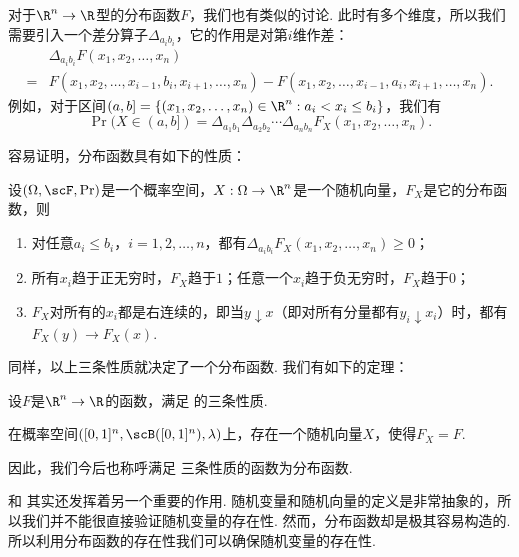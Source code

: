 对于$\R^n\to\R$型的分布函数$F$，我们也有类似的讨论. 此时有多个维度，所以我们需要引入一个差分算子$\Delta_{a_ib_i}$，它的作用是对第$i$维作差：
\begin{align*}
    &\Delta_{a_ib_i}F(x_1,x_2,\ldots,x_n) \\
    = &F(x_1,x_2,\ldots,x_{i-1},b_i,x_{i+1},\ldots,x_n)-F(x_1,x_2,\ldots,x_{i-1},a_i,x_{i+1},\ldots,x_n).
\end{align*}
例如，对于区间$(a,b]=\{(x_1,x_2,\ldots,x_n)\in\R^n:a_i<x_i\leq b_i\}$，我们有
\[
    \Pr(X\in(a,b]) = \Delta_{a_1b_1}\Delta_{a_2b_2}\cdots\Delta_{a_nb_n}F_X(x_1,x_2,\ldots,x_n).
\]

容易证明，分布函数具有如下的性质：

\begin{proposition}\label{prop:distribution-function-n}
设$(\Omega,\scF,\Pr)$是一个概率空间，$X:\Omega\to\R^n$是一个随机向量，$F_X$是它的分布函数，则
\begin{enumerate}
    \item 对任意$a_i\leq b_i$，$i=1,2,\ldots,n$，都有$\Delta_{a_ib_i}F_X(x_1,x_2,\ldots,x_n)\geq 0$；
    \item 所有$x_i$趋于正无穷时，$F_X$趋于$1$；任意一个$x_i$趋于负无穷时，$F_X$趋于$0$；
    \item $F_X$对所有的$x_i$都是右连续的，即当$y\downarrow x$（即对所有分量都有$y_i\downarrow x_i$）时，都有$F_X(y)\to F_X(x)$.
\end{enumerate}
\end{proposition}

同样，以上三条性质就决定了一个分布函数. 我们有如下的定理：

\begin{theorem}\label{thm:distribution-function-n}
设$F$是$\R^n\to\R$的函数，满足 的三条性质.

在概率空间$([0,1]^n,\scB([0,1]^n),\lambda)$上，存在一个随机向量$X$，使得$F_X=F$.
\end{theorem}

因此，我们今后也称呼满足 三条性质的函数为分布函数. 

\begin{remark}
 和 其实还发挥着另一个重要的作用. 随机变量和随机向量的定义是非常抽象的，所以我们并不能很直接验证随机变量的存在性. 然而，分布函数却是极其容易构造的. 所以利用分布函数的存在性我们可以确保随机变量的存在性. 
\end{remark}

